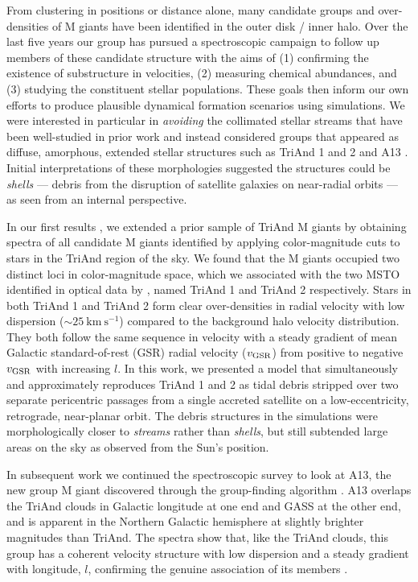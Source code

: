 \documentclass[galaxies,article,submit,moreauthors,pdftex,10pt,a4paper]{mdpi}
\newcommand{\kms}{\mathrm{km}~\mathrm{s}^{-1}}
\begin{document}
From clustering in positions or distance alone, many candidate groups and
over-densities of M giants have been identified in the outer disk / inner halo.
Over the last five years our group has pursued a spectroscopic campaign to
follow up members of these candidate structure with the aims of (1) confirming
the existence of substructure in velocities, (2) measuring chemical abundances,
and (3) studying the constituent stellar populations.
These goals then inform our own efforts to produce plausible dynamical
formation scenarios using simulations.
We were interested in particular in {\it avoiding} the collimated stellar streams that have been well-studied in prior work \cite[such as Sgr, Orphan, GD1 and Pal 5 --- see, e.g.,][]{law10,koposov10,kuepper15,bovy16}
and instead considered groups that appeared as diffuse, amorphous, extended stellar structures such as TriAnd 1 and 2 \cite{rochapinto04} and A13 \cite{sharma10}.
Initial interpretations of these morphologies suggested the structures could be {\it shells} --- debris from the disruption of satellite galaxies on near-radial orbits \cite{johnston08} --- as seen from an internal perspective.

In our first results \cite{sheffield14}, we extended a prior sample of TriAnd
M giants \cite{rochapinto04} by obtaining spectra of all candidate M giants identified by applying color-magnitude cuts to stars in the TriAnd region of the sky.
We found that the M giants occupied two distinct loci in color-magnitude space, which we associated with the two MSTO identified in optical data by \cite{martin07}, named TriAnd 1 and TriAnd 2 respectively.
Stars in both TriAnd 1 and TriAnd 2  form  clear over-densities in radial velocity with low dispersion ($\sim 25~\kms$) compared to the background halo velocity distribution.
They both follow the same  sequence in velocity with a steady gradient of mean Galactic standard-of-rest (GSR) radial velocity ($v_{\rm GSR}$) from positive to negative $v_{\rm GSR}$ with increasing $l$.
In this work, we presented a model that simultaneously and approximately reproduces TriAnd 1 and 2 as tidal debris stripped over two separate pericentric passages from a single accreted satellite on a low-eccentricity, retrograde, near-planar orbit.
The debris structures in the simulations were morphologically closer to {\it streams} rather
than {\it shells}, but still subtended large areas on the sky as observed from
the Sun's position.

In subsequent work we continued the spectroscopic survey to look at A13, the new group M giant discovered through the group-finding algorithm \cite{sharma10}. A13 overlaps the TriAnd clouds in Galactic longitude at one end and GASS at the other end, and is apparent in the Northern Galactic hemisphere at slightly brighter magnitudes than TriAnd. The spectra show that, like the TriAnd clouds, this group has a coherent velocity structure with low dispersion and a steady gradient with longitude, $l$, confirming the genuine association of its members \cite{li17}.
\end{document}
